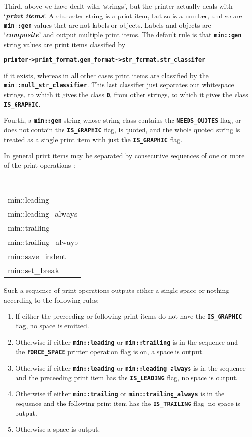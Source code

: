 \documentclass[12pt]{article}
\newcommand{\TT}[1]{{\tt \bfseries #1}}
\newcommand{\TTALL}{\tt \bfseries}
\newcommand{\key}[1]{{\bf \em #1}\index{#1}}
\newcommand{\ikey}[2]{{\bf \em #1}\index{#2}}
\newcommand{\EOL}{\penalty \exhyphenpenalty}
\begin{document}
Third, above we have dealt with `strings', but the printer actually
deals with
`\ikey{print items}{print item}'\label{PRINT-ITEM}.
A character string is a print item, but so is a number, and so are
\TT{min::gen} values that are not labels or objects.  Labels and
objects are `\key{composite}' and output multiple print items.
The default rule is that \TT{min::gen} string values are print
items classified by

\begin{center}
\TT{printer->print\_format.gen\_format->str\_format.str\_classifer}
\end{center}

if it exists, whereas in all other cases print items are classified by
the \TT{min::\EOL null\_\EOL str\_\EOL classifier}.
This last classifier just separates out whitespace strings, to which
it gives the class \TT{0}, from other strings, to which it gives
the class \TT{IS\_\EOL GRAPHIC}.

Fourth, a \TT{min::gen} string whose string class contains the
\TT{NEEDS\_\EOL QUOTES} flag, or does \underline{not}
contain the \TT{IS\_\EOL GRAPHIC} flag, is quoted,
and the whole quoted string is treated as a single print item with just the
\TT{IS\_\EOL GRAPHIC} flag.

In general print items may be separated by
consecutive sequences of one \underline{or more} of the print operations
\label{LEADING-TRAILING-RULES}:
\begin{center}
\TTALL
\begin{tabular}{l}
min::leading \\
min::leading\_always \\
min::trailing \\
min::trailing\_always \\
min::save\_indent \\
min::set\_break \\
\end{tabular}
\end{center}
Such a sequence of print operations outputs either a single space or
nothing according to the following rules:
\begin{enumerate}
\item If either the preceeding or following print items do not have the
\TT{IS\_\EOL GRAPHIC} flag, no space is emitted.
\item Otherwise if either \TT{min::leading} or \TT{min::trailing}
is in the sequence and the \TT{FORCE\_\EOL SPACE} printer\label{FORCE_SPACE}
operation flag is on, a space is output.
\item Otherwise if either \TT{min::leading} or \TT{min::leading\_\EOL always}
is in the sequence and the preceeding print item has the \TT{IS\_\EOL LEADING}
flag, no space is output.
\item Otherwise if either \TT{min::trailing} or \TT{min::trailing\_\EOL always}
is in the sequence and the following print item has the \TT{IS\_\EOL TRAILING}
flag, no space is output.
\item Otherwise a space is output.
\end{enumerate}
\end{document}
